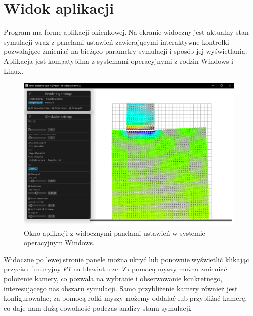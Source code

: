 \documentclass[12pt, letterpaper]{report}
\begin{document}
    \clearpage
    \section{Widok aplikacji}
    Program ma formę aplikacji okienkowej. Na ekranie widoczny jest aktualny stan symulacji wraz z 
    panelami ustawień zawierającymi interaktywne kontrolki pozwalające zmieniać na 
    bieżąco parametry symulacji i sposób jej wyświetlania. Aplikacja jest kompatybilna z
    systemami operacyjnymi z rodzin Windows i Linux.

    \begin{figure}[H]
        \centering
        \includegraphics[width=17cm]{app_view_full.png}
        \caption{
            Okno aplikacji z widocznymi panelami ustawień
            w systemie operacyjnym Windows.
        }
    \end{figure}
    
    Widoczne po lewej stronie panele można ukryć lub ponownie wyświetlić klikając
    przycisk funkcyjny \emph{F1} na klawiaturze. Za pomocą myszy można zmieniać położenie kamery, 
    co pozwala na wybranie i obserwowanie konkretnego, interesującego nas obszaru symulacji.
    Samo przybliżenie kamery również jest konfigurowalne; za pomocą rolki myszy możemy oddalać 
    lub przybliżać kamerę, co daje nam dużą dowolność podczas analizy stanu symulacji.
\end{document}
